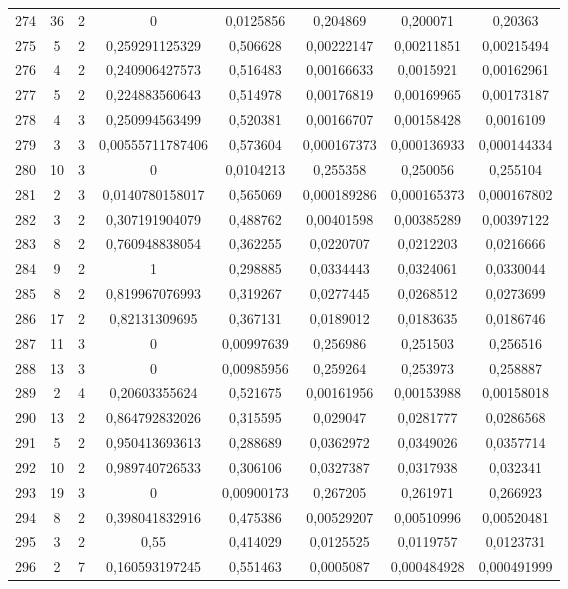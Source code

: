\begin{longtable}{|c|c|c|c|c|c|c|c|}
274 & 36 & 2 & 0 & 0,0125856 & 0,204869 & 0,200071 & 0,20363  \\
275 & 5 & 2 & 0,259291125329 & 0,506628 & 0,00222147 & 0,00211851 & 0,00215494  \\
276 & 4 & 2 & 0,240906427573 & 0,516483 & 0,00166633 & 0,0015921 & 0,00162961  \\
277 & 5 & 2 & 0,224883560643 & 0,514978 & 0,00176819 & 0,00169965 & 0,00173187  \\
278 & 4 & 3 & 0,250994563499 & 0,520381 & 0,00166707 & 0,00158428 & 0,0016109  \\
279 & 3 & 3 & 0,00555711787406 & 0,573604 & 0,000167373 & 0,000136933 & 0,000144334  \\
280 & 10 & 3 & 0 & 0,0104213 & 0,255358 & 0,250056 & 0,255104  \\
281 & 2 & 3 & 0,0140780158017 & 0,565069 & 0,000189286 & 0,000165373 & 0,000167802  \\
282 & 3 & 2 & 0,307191904079 & 0,488762 & 0,00401598 & 0,00385289 & 0,00397122  \\
283 & 8 & 2 & 0,760948838054 & 0,362255 & 0,0220707 & 0,0212203 & 0,0216666  \\
284 & 9 & 2 & 1 & 0,298885 & 0,0334443 & 0,0324061 & 0,0330044  \\
285 & 8 & 2 & 0,819967076993 & 0,319267 & 0,0277445 & 0,0268512 & 0,0273699  \\
286 & 17 & 2 & 0,82131309695 & 0,367131 & 0,0189012 & 0,0183635 & 0,0186746  \\
287 & 11 & 3 & 0 & 0,00997639 & 0,256986 & 0,251503 & 0,256516  \\
288 & 13 & 3 & 0 & 0,00985956 & 0,259264 & 0,253973 & 0,258887  \\
289 & 2 & 4 & 0,20603355624 & 0,521675 & 0,00161956 & 0,00153988 & 0,00158018  \\
290 & 13 & 2 & 0,864792832026 & 0,315595 & 0,029047 & 0,0281777 & 0,0286568  \\
291 & 5 & 2 & 0,950413693613 & 0,288689 & 0,0362972 & 0,0349026 & 0,0357714  \\
292 & 10 & 2 & 0,989740726533 & 0,306106 & 0,0327387 & 0,0317938 & 0,032341  \\
293 & 19 & 3 & 0 & 0,00900173 & 0,267205 & 0,261971 & 0,266923  \\
294 & 8 & 2 & 0,398041832916 & 0,475386 & 0,00529207 & 0,00510996 & 0,00520481  \\
295 & 3 & 2 & 0,55 & 0,414029 & 0,0125525 & 0,0119757 & 0,0123731  \\
296 & 2 & 7 & 0,160593197245 & 0,551463 & 0,0005087 & 0,000484928 & 0,000491999  \\

\end{longtable}
